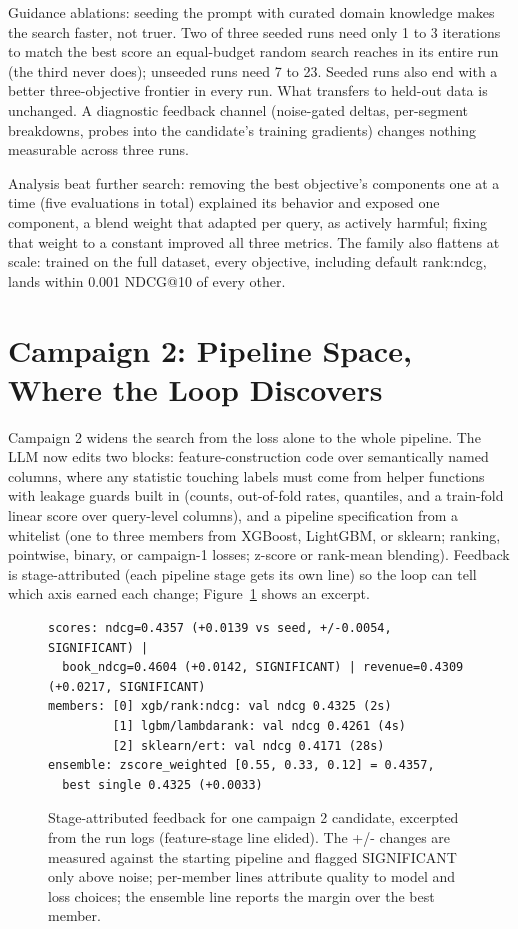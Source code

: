 \documentclass[]{ceurart}
\begin{document}
Guidance ablations: seeding the prompt with curated domain knowledge makes
the search faster, not truer. Two of three seeded runs need only 1 to 3
iterations to match the best score an equal-budget random search reaches in
its entire run (the third never does); unseeded runs need 7 to 23. Seeded runs also end with a better three-objective frontier in every run. What transfers
to held-out data is unchanged. A diagnostic feedback channel (noise-gated deltas, per-segment breakdowns,
probes into the candidate's training gradients) changes nothing measurable across three runs.

Analysis beat further search: removing the best objective's components one
at a time (five evaluations in total) explained its behavior and exposed one
component, a blend weight that adapted per query, as actively harmful;
fixing that weight to a constant improved all three metrics. The family also
flattens at scale: trained on the full dataset, every objective, including
default rank:ndcg, lands within 0.001 NDCG@10 of every other.

\section{Campaign 2: Pipeline Space, Where the Loop Discovers}
Campaign 2 widens the search from the loss alone to the whole pipeline.
The LLM now edits two blocks: feature-construction code over semantically
named columns, where any statistic touching labels must come from helper
functions with leakage guards built in (counts, out-of-fold rates,
quantiles, and a train-fold linear score over query-level columns), and a pipeline specification from a whitelist (one to three members from XGBoost, LightGBM, or sklearn; ranking,
pointwise, binary, or campaign-1 losses; z-score or rank-mean blending). Feedback is stage-attributed (each pipeline stage gets its own line) so
the loop can tell which axis earned each change; Figure~\ref{fig:feedback} shows an excerpt.

\begin{figure}
\footnotesize
\begin{verbatim}
scores: ndcg=0.4357 (+0.0139 vs seed, +/-0.0054, SIGNIFICANT) |
  book_ndcg=0.4604 (+0.0142, SIGNIFICANT) | revenue=0.4309 (+0.0217, SIGNIFICANT)
members: [0] xgb/rank:ndcg: val ndcg 0.4325 (2s)
         [1] lgbm/lambdarank: val ndcg 0.4261 (4s)
         [2] sklearn/ert: val ndcg 0.4171 (28s)
ensemble: zscore_weighted [0.55, 0.33, 0.12] = 0.4357,
  best single 0.4325 (+0.0033)
\end{verbatim}
\caption{Stage-attributed feedback for one campaign 2 candidate, excerpted
from the run logs (feature-stage line elided). The +/- changes are measured
against the starting pipeline and flagged SIGNIFICANT only above noise;
per-member lines attribute quality to model and loss choices; the ensemble
line reports the margin over the best member.}
\label{fig:feedback}
\end{figure}
\end{document}
